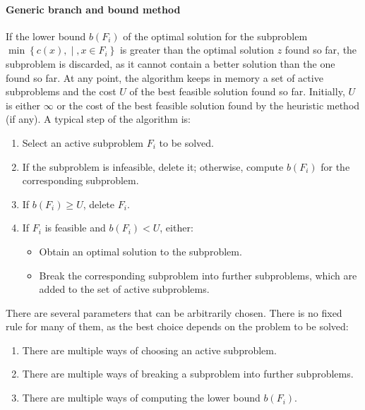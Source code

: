 \paragraph*{Generic branch and bound method}
If the lower bound $b(F_i)$ of the optimal solution for the subproblem $\min\left\{ c(x), \middle\vert, x \in F_i \right\}$ is greater than the optimal solution $z$ found so far, the subproblem is discarded, as it cannot contain a better solution than the one found so far.
At any point, the algorithm keeps in memory a set of active subproblems and the cost $U$ of the best feasible solution found so far.
Initially, $U$ is either $\infty$ or the cost of the best feasible solution found by the heuristic method (if any).
A typical step of the algorithm is:
\begin{enumerate}
    \item Select an active subproblem $F_i$ to be solved. 
    \item If the subproblem is infeasible, delete it; otherwise, compute $b(F_i)$ for the corresponding subproblem.
    \item If $b(F_i) \geq U$, delete $F_i$.
    \item If $F_i$ is feasible and $b(F_i) < U$, either:
        \begin{itemize}
            \item Obtain an optimal solution to the subproblem.
            \item Break the corresponding subproblem into further subproblems, which are added to the set of active subproblems.
        \end{itemize}
\end{enumerate}
There are several parameters that can be arbitrarily chosen. 
There is no fixed rule for many of them, as the best choice depends on the problem to be solved:
\begin{enumerate}
    \item There are multiple ways of choosing an active subproblem.
    \item There are multiple ways of breaking a subproblem into further subproblems.
    \item There are multiple ways of computing the lower bound $b(F_i)$.
\end{enumerate}

